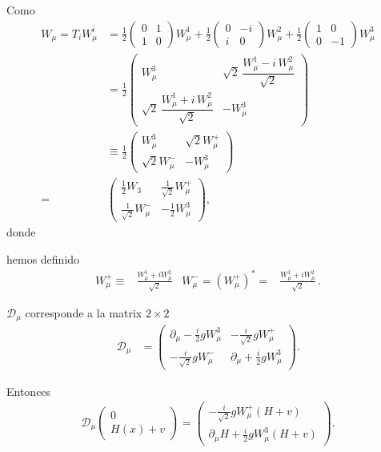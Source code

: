 Como
\begin{align}
\label{eq:w22}
      W_\mu=T_i W^{i}_\mu&=
  \frac{1}{2}\begin{pmatrix}
    0&1\\
    1&0
  \end{pmatrix}W^1_\mu+
  \frac{1}{2}\begin{pmatrix}
    0&-i\\
    i&0
  \end{pmatrix}W^2_\mu+
  \frac{1}{2}\begin{pmatrix}
    1&0\\
    0&-1
  \end{pmatrix}W^3_\mu\nonumber\\
  &=
  \frac{1}{2}\begin{pmatrix}
    W^3_\mu                                  &\sqrt{2}\,\dfrac{W^1_\mu-i\,W^2_\mu}{\sqrt{2}}\\
    \sqrt{2}\,\dfrac{W^1_\mu+i\,W^2_\mu}{\sqrt{2}} &-W^3_\mu
  \end{pmatrix}\nonumber\\
  &\equiv
  \frac{1}{2}\begin{pmatrix}
    W^3_\mu&\sqrt{2}W^+_\mu\\
    \sqrt{2}W^-_\mu&-W^3_\mu
  \end{pmatrix}\nonumber\\
=&\begin{pmatrix}
    \frac{1}{2}W_3&\frac{1}{\sqrt{2}}W^+_\mu\\
    \frac{1}{\sqrt{2}}W^-_\mu&-\frac{1}{2}W^3_\mu
  \end{pmatrix},
\end{align}
donde
\begin{frame}
hemos definido
\begin{align}
  W_{\mu}^{+}\equiv& \frac{W_{\mu}^1+i W_{\mu}^2}{\sqrt{2}} & 
  W_{\mu}^{-}=\left( W_{\mu}^{+} \right)^{*}=& \frac{W_{\mu}^1+i W_{\mu}^2}{\sqrt{2}}\,. 
\end{align}

$\mathcal{D}_\mu$ corresponde a la matrix $2\times  2$
\begin{align}
\label{eq:d22}
 \mathcal{D}_\mu &=  \begin{pmatrix}
    \partial_\mu-\frac{i}{2}g W^3_\mu&-\frac{i}{\sqrt{2}}g W^+_\mu\\
    -\frac{i}{\sqrt{2}}g W^-_\mu&\partial_\mu+\frac{i}{2}g W^3_\mu
  \end{pmatrix}.
\end{align}
\end{frame}
Entonces
\begin{align}
\mathcal{D}_\mu \begin{pmatrix}
    0\\
    H(x)+v
  \end{pmatrix}=\begin{pmatrix}
    -\frac{i}{\sqrt{2}}gW_\mu^+(H+v)\\
    \partial_\mu H+\frac{i}{2}gW^3_\mu(H+v)
  \end{pmatrix}.
\end{align}

